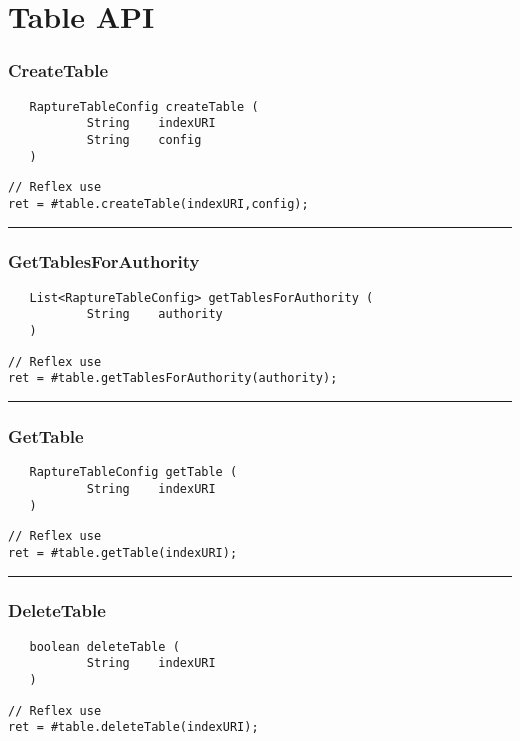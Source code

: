 \section{Table API}

\subsubsection{CreateTable}
\label{Api:CreateTable}
\begin{verbatim}
   RaptureTableConfig createTable (
           String    indexURI
           String    config
   )
\end{verbatim}
\begin{lstlisting}[language=reflex]
// Reflex use
ret = #table.createTable(indexURI,config);
\end{lstlisting}



\rule{15cm}{2pt}
\subsubsection{GetTablesForAuthority}
\label{Api:GetTablesForAuthority}
\begin{verbatim}
   List<RaptureTableConfig> getTablesForAuthority (
           String    authority
   )
\end{verbatim}
\begin{lstlisting}[language=reflex]
// Reflex use
ret = #table.getTablesForAuthority(authority);
\end{lstlisting}



\rule{15cm}{2pt}
\subsubsection{GetTable}
\label{Api:GetTable}
\begin{verbatim}
   RaptureTableConfig getTable (
           String    indexURI
   )
\end{verbatim}
\begin{lstlisting}[language=reflex]
// Reflex use
ret = #table.getTable(indexURI);
\end{lstlisting}



\rule{15cm}{2pt}
\subsubsection{DeleteTable}
\label{Api:DeleteTable}
\begin{verbatim}
   boolean deleteTable (
           String    indexURI
   )
\end{verbatim}
\begin{lstlisting}[language=reflex]
// Reflex use
ret = #table.deleteTable(indexURI);
\end{lstlisting}



